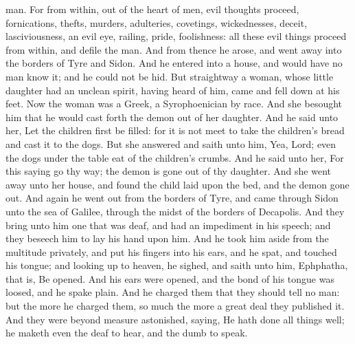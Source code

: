 man. For from within, out of the heart of men, evil thoughts proceed, fornications, thefts, murders, adulteries, covetings, wickednesses, deceit, lasciviousness, an evil eye, railing, pride, foolishness: all these evil things proceed from within, and defile the man.  And from thence he arose, and went away into the borders of Tyre and Sidon. And he entered into a house, and would have no man know it; and he could not be hid. But straightway a woman, whose little daughter had an unclean spirit, having heard of him, came and fell down at his feet. Now the woman was a Greek, a Syrophoenician by race. And she besought him that he would cast forth the demon out of her daughter. And he said unto her, Let the children first be filled: for it is not meet to take the children’s bread and cast it to the dogs. But she answered and saith unto him, Yea, Lord; even the dogs under the table eat of the children’s crumbs. And he said unto her, For this saying go thy way; the demon is gone out of thy daughter. And she went away unto her house, and found the child laid upon the bed, and the demon gone out.  And again he went out from the borders of Tyre, and came through Sidon unto the sea of Galilee, through the midst of the borders of Decapolis. And they bring unto him one that was deaf, and had an impediment in his speech; and they beseech him to lay his hand upon him. And he took him aside from the multitude privately, and put his fingers into his ears, and he spat, and touched his tongue; and looking up to heaven, he sighed, and saith unto him, Ephphatha, that is, Be opened. And his ears were opened, and the bond of his tongue was loosed, and he spake plain. And he charged them that they should tell no man: but the more he charged them, so much the more a great deal they published it. And they were beyond measure astonished, saying, He hath done all things well; he maketh even the deaf to hear, and the dumb to speak. 

